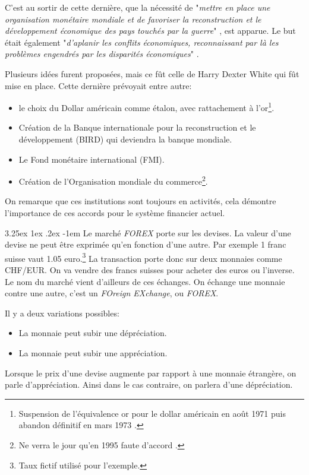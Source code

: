 \documentclass[a4paper, 11pt]{article}
\makeatletter
\renewcommand\paragraph{\@startsection{paragraph}{5}{\z@}%
  {3.25ex \@plus1ex \@minus.2ex}%
  {-1em}%
  {\normalfont\normalsize\bfseries}}
\makeatother
\begin{document}
C'est au sortir de cette dernière, que la nécessité de "\textit{mettre en place une organisation monétaire mondiale et de favoriser la reconstruction et le
développement économique des pays touchés par la guerre}" \cite{wikipedia_bretten_woods}, est apparue.
Le but était également "\textit{d’aplanir les conflits économiques, reconnaissant par là les problèmes engendrés par les disparités économiques}"
\cite{etalon_or_a_etalon_dollar}.

Plusieurs idées furent proposées, mais ce fût celle de Harry Dexter White qui fût mise en place. Cette dernière prévoyait entre autre:
\begin{itemize}
\item le choix du Dollar américain comme étalon, avec rattachement à l'or\footnote{Suspension de l'équivalence or pour le dollar américain en août 1971 puis abandon 
définitif en mars 1973 \cite{wikipedia_bretten_woods}.}.
\item Création de la Banque internationale pour la reconstruction et le développement (BIRD) qui deviendra la banque mondiale.
\item Le Fond monétaire international (FMI).
\item Création de l'Organisation mondiale du commerce\footnote{Ne verra le jour qu'en 1995 faute d'accord \cite{wikipedia_bretten_woods}.}.
\end{itemize}

On remarque que ces institutions sont toujours en activités, 
cela démontre l'importance de ces accords pour le système financier actuel.

\paragraph{}
Le marché \textit{FOREX} porte sur les devises. La valeur d'une devise ne peut être exprimée qu'en fonction d'une autre. 
Par exemple 1 franc suisse vaut 1.05 euro.\footnote{Taux fictif utilisé pour l'exemple.}
La transaction porte donc sur deux monnaies comme CHF/EUR. On va vendre des francs suisses pour acheter des euros ou l'inverse.
Le nom du marché vient d'ailleurs de ces échanges. 
On échange une monnaie contre une autre, c'est un \textit{FOreign EXchange}, ou \textit{FOREX}.

Il y a deux variations possibles:
\begin{itemize}
\item La monnaie peut subir une dépréciation.
\item La monnaie peut subir une appréciation.
\end{itemize}
Lorsque le prix d'une devise augmente par rapport à une monnaie étrangère, on parle d'appréciation. 
Ainsi dans le cas contraire, on parlera d'une dépréciation.
\end{document}
